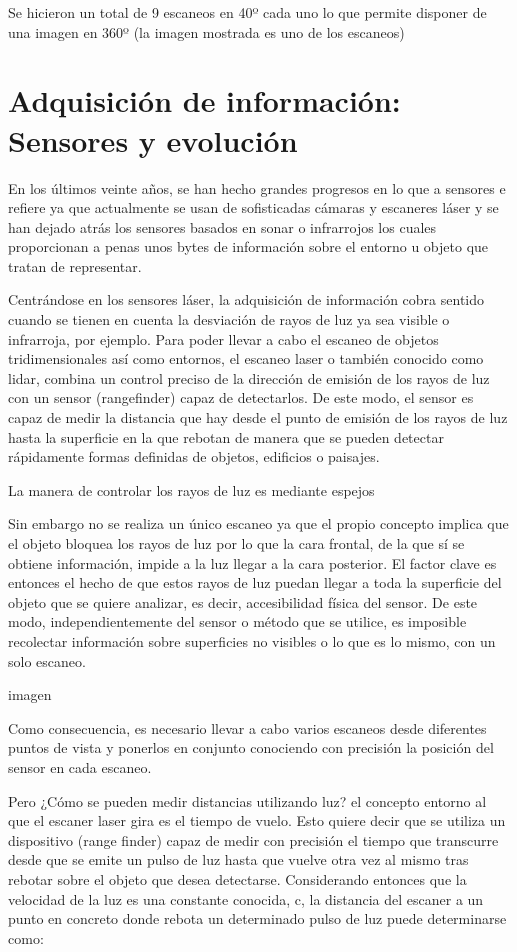 Se hicieron un total de 9 escaneos en 40º cada uno lo que permite disponer de una imagen en 360º (la imagen mostrada es uno de los escaneos)




\section{Adquisición de información: Sensores y evolución}

En los últimos veinte años, se han hecho grandes progresos en lo que a sensores e refiere ya que actualmente se usan de sofisticadas cámaras y escaneres láser y se han dejado atrás los sensores basados en sonar o infrarrojos los cuales proporcionan a penas unos bytes de información sobre el entorno u objeto que tratan de representar.


Centrándose en los sensores láser, la adquisición de información cobra sentido cuando se tienen en cuenta la desviación de rayos de luz ya sea visible o infrarroja, por ejemplo. Para poder llevar a cabo el escaneo de objetos tridimensionales así como entornos, el escaneo laser o también conocido como lidar, combina un control preciso de la dirección de emisión de los rayos de luz con un sensor (rangefinder) capaz de detectarlos. De este modo, el sensor es capaz de medir la distancia que hay desde el punto de emisión de los rayos de luz hasta la superficie en la que rebotan de manera que se pueden detectar rápidamente formas definidas de objetos, edificios o paisajes.

La manera de controlar los rayos de luz es mediante espejos

Sin embargo no se realiza un único escaneo ya que el propio concepto implica que el objeto bloquea los rayos de luz por lo que la cara frontal, de la que sí se obtiene información, impide a la luz llegar a la cara posterior. El factor clave es entonces el hecho de que estos rayos de luz puedan llegar a toda la superficie del objeto que se quiere analizar, es decir, accesibilidad física del sensor.
De este modo, independientemente del sensor o método que se utilice, es imposible recolectar
información sobre superficies no visibles o lo que es lo mismo, con un solo escaneo.


imagen 

Como consecuencia, es necesario llevar a cabo varios escaneos desde diferentes puntos de vista y
ponerlos en conjunto conociendo con precisión la posición del sensor en cada escaneo.


Pero ¿Cómo se pueden medir distancias utilizando luz? el concepto entorno al que el escaner laser gira es el tiempo de vuelo. Esto quiere decir que se utiliza un dispositivo (range finder) capaz de medir con precisión el tiempo que transcurre desde que se emite un pulso de luz hasta que vuelve otra vez al mismo tras rebotar sobre el objeto que desea detectarse. Considerando entonces que la velocidad de la luz es una constante conocida, c, la distancia del escaner a un punto en concreto donde rebota un determinado pulso de luz puede determinarse como:

